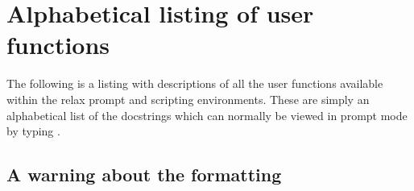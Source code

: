 


\chapter{Alphabetical listing of user functions}

The following is a listing with descriptions of all the user functions available within the relax prompt and scripting environments.
These are simply an alphabetical list of the docstrings which can normally be viewed in prompt mode by typing .





\section{A warning about the formatting}

